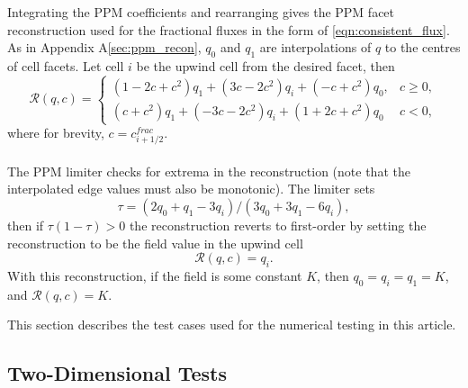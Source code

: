 \documentclass{ametsocV6.1}
\begin{document}
Integrating the PPM coefficients and rearranging gives the PPM facet reconstruction used for the fractional fluxes in the form of \eqref{eqn:consistent_flux}.
As in Appendix A\ref{sec:ppm_recon}, $q_0$ and $q_1$ are interpolations of $q$ to the centres of cell facets.
Let cell $i$ be the upwind cell from the desired facet, then
\begin{equation}
\mathcal{R}(q,c) =
\begin{cases}
(1-2c+c^2)q_1 + (3c-2c^2)q_{i} + (-c+c^2)q_0, & c \geq 0, \\
(c+c^2)q_1 + (-3c-2c^2)q_{i} + (1+2c+c^2)q_0 & c < 0,
\end{cases}
\end{equation}
where for brevity, $c=c^{frac}_{i+1/2}$. \\
\\
The PPM limiter checks for extrema in the reconstruction (note that the interpolated edge values must also be monotonic). The limiter sets
\begin{equation}
\tau = (2q_0+q_1-3q_{i})/(3q_0+3q_1-6q_{i}),
\end{equation}
then if $\tau (1-\tau) > 0$ the reconstruction reverts to first-order by setting the reconstruction to be the field value in the upwind cell
\begin{equation}
\mathcal{R}(q,c) = q_i.
\end{equation}
With this reconstruction, if the field is some constant $K$, then $q_0=q_i=q_1=K$, and $\mathcal{R}(q,c)=K$.

\appendix[B] \label{sec:test_appendix}



This section describes the test cases used for the numerical testing in this article. 

\subsection{Two-Dimensional Tests}
\end{document}

